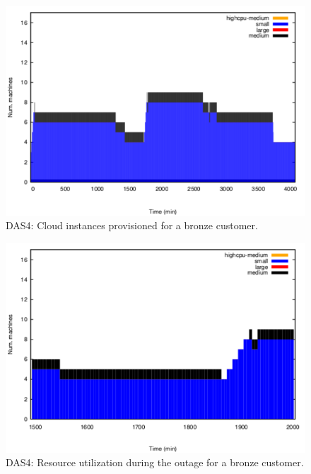 \begin{figure}
  \begin{center}
    \includegraphics[width=.85\linewidth]{images/exps2011/low/das/inst_type_machines}
  \end{center}
\vspace{-5mm}
  \caption{DAS4: Cloud instances provisioned for a bronze customer.}
  \label{lowInstances}
\end{figure}

\begin{figure}
  \begin{center}
    \includegraphics[width=.85\linewidth]{images/exps2011/low/das/inst_type_machines_filtered.pdf}
  \end{center}
\vspace{-5mm}
  \caption{DAS4: Resource utilization during the outage for a bronze customer.}
  \label{resOutage}
\end{figure}



